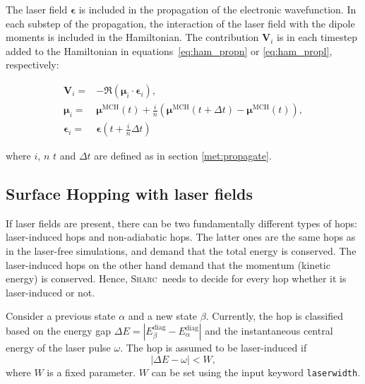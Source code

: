 \documentclass[a4paper,11pt,DIV=15,openany,twoside=false]{scrbook}
\newcommand{\tthdump}[1]{#1}
\newcommand{\sharc}{\textsc{Sharc}}
\newcommand{\ttt}[1]{\texttt{#1}}
\renewcommand{\vec}[1]{\ensuremath{\mathbf{#1}}}
\begin{document}
The laser field $\boldsymbol{\epsilon}$ is included in the propagation of the electronic wavefunction. In each substep of the propagation, the interaction of the laser field with the dipole moments is included in the Hamiltonian. The contribution $\vec{V}_i$ is in each timestep added to the Hamiltonian in equations~\eqref{eq:ham_propn} or \eqref{eq:ham_propl}, respectively:
\tthdump{
  \begin{align}
    \vec{V}_i=&
    -
    \Re\left(
      \boldsymbol{\mu}_i\cdot
      \boldsymbol{\epsilon}_i
    \right),\\
    \boldsymbol{\mu}_i=&
    \boldsymbol{\mu}^{\text{MCH}}(t) + \frac{i}{n}
    \left(
      \boldsymbol{\mu}^{\text{MCH}}(t+\Delta t)-\boldsymbol{\mu}^{\text{MCH}}(t)
    \right),\\
    \boldsymbol{\epsilon}_i=&\boldsymbol{\epsilon}\left(t+\frac{i}{n}\Delta t\right)
  \end{align}
}
where $i$, $n$ $t$ and $\Delta t$ are defined as in section \ref{met:propagate}.

\subsection{Surface Hopping with laser fields}

If laser fields are present, there can be two fundamentally different types of hops: laser-induced hops and non-adiabatic hops. The latter ones are the same hops as in the laser-free simulations, and demand that the total energy is conserved. The laser-induced hops on the other hand demand that the momentum (kinetic energy) is conserved. Hence, \sharc\ needs to decide for every hop whether it is laser-induced or not. 

Consider a previous state $\alpha$ and a new state $\beta$. Currently, the hop is classified based on the energy gap $\Delta E=|E_\beta^\text{diag}-E_\alpha^\text{diag}|$ and the instantaneous central energy of the laser pulse $\omega$. 
The hop is assumed to be laser-induced if
\begin{equation}
  |\Delta E-\omega| < W,
\end{equation}
where $W$ is a fixed parameter. $W$ can be set using the input keyword \ttt{laserwidth}.
\end{document}

